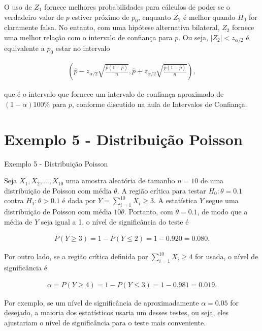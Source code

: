 \documentclass[12pt]{beamer}
\begin{document}
\begin{frame}{}
\begin{block}{}
\justifying
O uso de $Z_1$ fornece melhores probabilidades para cálculos de poder se o verdadeiro valor de $p$ estiver próximo de $p_0$, enquanto $Z_2$ é melhor quando $H_0$ for claramente falsa. No entanto, com uma hipótese alternativa bilateral, $Z_2$ fornece uma melhor relação com o intervalo de confiança para $p$. Ou seja, $|Z_2| < z_{\alpha/2}$ é equivalente a $p_0$ estar no intervalo

\begin{align*}
\left(\hat{p} - z_{\alpha/2}\sqrt{\frac{\hat{p}(1 - \hat{p})}{n}}, \hat{p} + z_{\alpha/2}\sqrt{\frac{\hat{p}(1 - \hat{p})}{n}}\right),
\end{align*}

que é o intervalo que fornece um intervalo de confiança aproximado de $(1 - \alpha)100\%$ para $p$, conforme discutido na aula de Intervalos de Confiança.
\end{block}
\end{frame}

\section{Exemplo 5 - Distribuição Poisson}
\begin{frame}{Exemplo 5 - Distribuição Poisson}
\begin{block}{}
\justifying
Seja $X_1, X_2, \ldots, X_{10}$ uma amostra aleatória de tamanho $n = 10$ de uma distribuição de Poisson com média $\theta$. A região crítica para testar $H_0 : \theta = 0.1$ contra $H_1 : \theta > 0.1$ é dada por $Y = {\displaystyle \sum_{i=1}^{10}} X_i \geq 3$. A estatística $Y$ segue uma distribuição de Poisson com média $10\theta$. Portanto, com $\theta = 0.1$, de modo que a média de $Y$ seja igual a 1, o nível de significância do teste é

\begin{align*}
P(Y \geq 3) = 1 - P(Y \leq 2) = 1 - 0.920 = 0.080.
\end{align*}
\end{block}
\end{frame}

\begin{frame}{}
\begin{block}{}
\justifying
Por outro lado, se a região crítica definida por $\sum_{i=1}^{10} X_i \geq 4$ for usada, o nível de significância é

\begin{align*}
\alpha = P(Y \geq 4) = 1 - P(Y \leq 3) = 1 - 0.981 = 0.019.
\end{align*}

Por exemplo, se um nível de significância de aproximadamente $\alpha = 0.05$ for desejado, a maioria dos estatísticos usaria um desses testes, ou seja, eles ajustariam o nível de significância para o teste mais conveniente. 
\end{block}
\end{frame}
\end{document}
